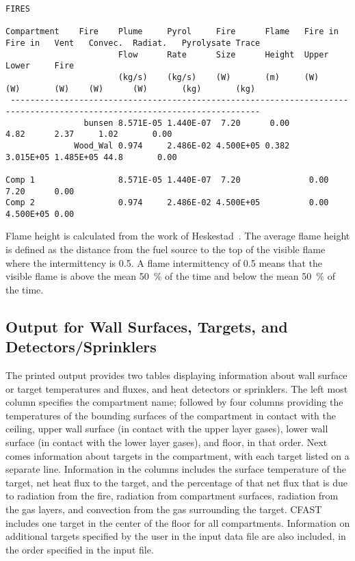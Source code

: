 \begin{lstlisting}[basicstyle=\tiny]
FIRES

Compartment    Fire    Plume     Pyrol     Fire      Flame   Fire in  Fire in   Vent   Convec.  Radiat.   Pyrolysate Trace
                       Flow      Rate      Size      Height  Upper    Lower     Fire
                       (kg/s)    (kg/s)    (W)       (m)     (W)      (W)       (W)    (W)      (W)       (kg)       (kg)
 -------------------------------------------------------------------------------------------------------------------------
                bunsen 8.571E-05 1.440E-07  7.20      0.00                              4.82      2.37     1.02       0.00
              Wood_Wal 0.974     2.486E-02 4.500E+05 0.382                             3.015E+05 1.485E+05 44.8       0.00

Comp 1                 8.571E-05 1.440E-07  7.20              0.00     7.20      0.00
Comp 2                 0.974     2.486E-02 4.500E+05          0.00     4.500E+05 0.00
\end{lstlisting}
Flame height is calculated from the work of Heskestad~\cite{Heskestad:2002}. The average flame height is defined as the distance from the fuel source to the top of the visible flame where the intermittency is 0.5.  A flame intermittency of 0.5 means that the visible flame is above the mean 50~\% of the time and below the mean 50~\% of the time.

\subsection{Output for Wall Surfaces, Targets, and Detectors/Sprinklers}

The printed output provides two tables displaying information about wall surface or target temperatures and fluxes, and heat detectors or sprinklers. The left most column specifies the compartment name; followed by four columns providing the temperatures of the bounding surfaces of the compartment in contact with the ceiling, upper wall surface (in contact with the upper layer gases), lower wall surface (in contact with the lower layer gases), and floor, in that order. Next comes information about targets in the compartment, with each target listed on a separate line.  Information in the columns includes the surface temperature of the target, net heat flux to the target, and the percentage of that net flux that is due to radiation from the fire, radiation from compartment surfaces, radiation from the gas layers, and convection from the gas surrounding the target.  CFAST includes one target in the center of the floor for all compartments. Information on additional targets specified by the user in the input data file are also included, in the order specified in the input file.

